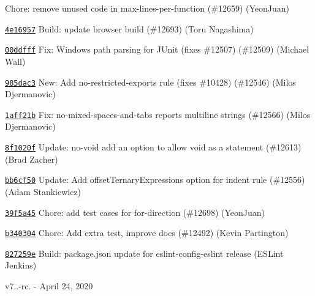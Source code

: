\begin{DoxyItemize}
\item \href{https://github.com/eslint/eslint/commit/474439720258b1a64b305c31588f803104fa4aaf}{\texttt{ {}}} Chore\+: remove unused code in max-\/lines-\/per-\/function (\#12659) (Yeon\+Juan)
\item \href{https://github.com/eslint/eslint/commit/4e169576a526023ee297d5bc8b37eedba229f63d}{\texttt{ {\ttfamily 4e16957}}} Build\+: update browser build (\#12693) (Toru Nagashima)
\item \href{https://github.com/eslint/eslint/commit/00ddfffe6b4b4244e4680b0f92f2c6697fad136f}{\texttt{ {\ttfamily 00ddfff}}} Fix\+: Windows path parsing for JUnit (fixes \#12507) (\#12509) (Michael Wall)
\item \href{https://github.com/eslint/eslint/commit/985dac35e3c367f0f99d1f0e766e06a1d9818dd4}{\texttt{ {\ttfamily 985dac3}}} New\+: Add no-\/restricted-\/exports rule (fixes \#10428) (\#12546) (Milos Djermanovic)
\item \href{https://github.com/eslint/eslint/commit/1aff21bb54da44cef0b6e378a34a74265863b930}{\texttt{ {\ttfamily 1aff21b}}} Fix\+: no-\/mixed-\/spaces-\/and-\/tabs reports multiline strings (\#12566) (Milos Djermanovic)
\item \href{https://github.com/eslint/eslint/commit/8f1020ff711b0c57d590bf666e2841f64186d083}{\texttt{ {\ttfamily 8f1020f}}} Update\+: no-\/void add an option to allow void as a statement (\#12613) (Brad Zacher)
\item \href{https://github.com/eslint/eslint/commit/bb6cf5082623ffb67bb1495fee52c0610ee5f421}{\texttt{ {\ttfamily bb6cf50}}} Update\+: Add offset\+Ternary\+Expressions option for indent rule (\#12556) (Adam Stankiewicz)
\item \href{https://github.com/eslint/eslint/commit/39f5a453579b2ad732212edeb71f84ecb0991f97}{\texttt{ {\ttfamily 39f5a45}}} Chore\+: add test cases for for-\/direction (\#12698) (Yeon\+Juan)
\item \href{https://github.com/eslint/eslint/commit/b3403045e535921df6d34785a4ce053e14ba27fd}{\texttt{ {\ttfamily b340304}}} Chore\+: Add extra test, improve docs (\#12492) (Kevin Partington)
\item \href{https://github.com/eslint/eslint/commit/827259ea009f98a0fdf3f7ebf1bfb6cd661ce28d}{\texttt{ {\ttfamily 827259e}}} Build\+: package.\+json update for eslint-\/config-\/eslint release (ESLint Jenkins)
\end{DoxyItemize}

v7..-\/rc. -\/ April 24, 2020


